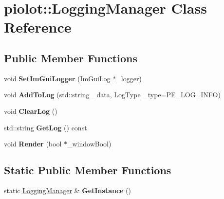 \hypertarget{classpiolot_1_1_logging_manager}{}\section{piolot\+:\+:Logging\+Manager Class Reference}
\label{classpiolot_1_1_logging_manager}
\subsection*{Public Member Functions}
\begin{DoxyCompactItemize}
\item 
\mbox{\label{classpiolot_1_1_logging_manager_aa0a0a7241a2d993282a18d7a8bded2ac}} 
void {\bfseries Set\+Im\+Gui\+Logger} (\mbox{\hyperlink{structpiolot_1_1_im_gui_log}{Im\+Gui\+Log}} $\ast$\+\_\+logger)
\item 
\mbox{\label{classpiolot_1_1_logging_manager_a1678abfa124029b3825887e4730c6e82}} 
void {\bfseries Add\+To\+Log} (std\+::string \+\_\+data, Log\+Type \+\_\+type=P\+E\+\_\+\+L\+O\+G\+\_\+\+I\+N\+FO)
\item 
\mbox{\label{classpiolot_1_1_logging_manager_a07a9311aef0e303169a6b2bbc1c62e9c}} 
void {\bfseries Clear\+Log} ()
\item 
\mbox{\label{classpiolot_1_1_logging_manager_a3f59696c7ffafedf86c62bf497543b63}} 
std\+::string {\bfseries Get\+Log} () const
\item 
\mbox{\label{classpiolot_1_1_logging_manager_a29156d923419bb4104d6f05784accb97}} 
void {\bfseries Render} (bool $\ast$\+\_\+window\+Bool)
\end{DoxyCompactItemize}
\subsection*{Static Public Member Functions}
\begin{DoxyCompactItemize}
\item 
\mbox{\label{classpiolot_1_1_logging_manager_a365a705c958728e638d446e55c3d721f}} 
static \mbox{\hyperlink{classpiolot_1_1_logging_manager}{Logging\+Manager}} \& {\bfseries Get\+Instance} ()
\end{DoxyCompactItemize}

